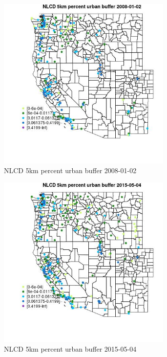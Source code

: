 \begin{figure} 
\centering  
\includegraphics[width=0.77\textwidth]{Code_Outputs/Report_ML_input_PM25_Step4_part_e_de_duplicated_aves_compiled_2019-05-18wNAs_MapObsNLCD_5km_percent_urban_buffer2008-01-02.jpg} 
\caption{\label{fig:Report_ML_input_PM25_Step4_part_e_de_duplicated_aves_compiled_2019-05-18wNAsMapObsNLCD_5km_percent_urban_buffer2008-01-02}NLCD 5km percent urban buffer 2008-01-02} 
\end{figure} 
 

\begin{figure} 
\centering  
\includegraphics[width=0.77\textwidth]{Code_Outputs/Report_ML_input_PM25_Step4_part_e_de_duplicated_aves_compiled_2019-05-18wNAs_MapObsNLCD_5km_percent_urban_buffer2015-05-04.jpg} 
\caption{\label{fig:Report_ML_input_PM25_Step4_part_e_de_duplicated_aves_compiled_2019-05-18wNAsMapObsNLCD_5km_percent_urban_buffer2015-05-04}NLCD 5km percent urban buffer 2015-05-04} 
\end{figure} 
 

